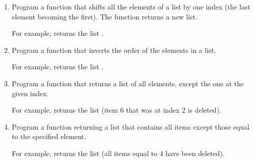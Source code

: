 \documentclass[11pt,class=report,crop=false]{standalone}
\begin{document}
\begin{activite}


\begin{enumerate}
  \item Program a function  that shifts all the elements of a list by one index (the last element becoming the first). The function returns a new list.
  
  For example,  returns the list \ci{[4,1,2,3]}.
  
  \item Program a function  that inverts the order of the elements in a list. 
  
  For example,  returns the list \ci{[4,3,2,1]}.
  
  \item Program a function  that returns a list of all elements, except the one at the given index. 
  
  For example,  returns the list \ci{[8,7,5,4]} (item $6$ that was at index $2$ is deleted).
  
    \item Program a function  returning a list that contains all items except those equal to the specified element. 
    
 For example,  returns the list \ci{[8,7,6,5]} (all items equal to $4$ have been deleted).
    
\end{enumerate}

\end{activite}
\end{document}
